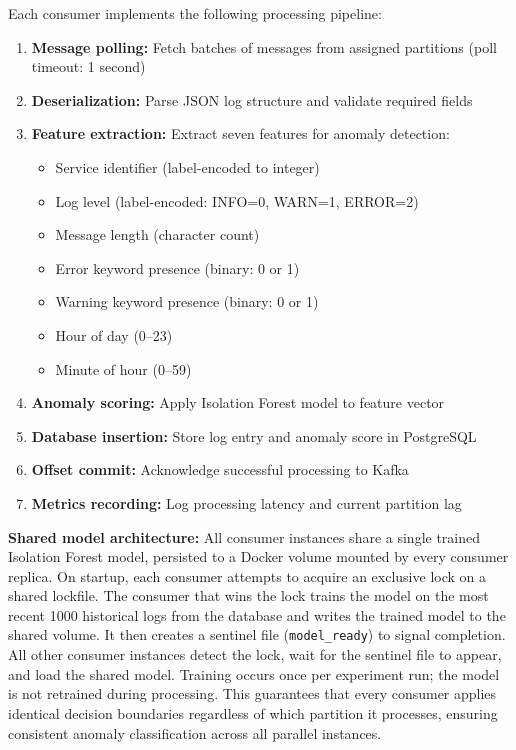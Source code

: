 \documentclass[12pt,a4paper]{report}
\begin{document}
Each consumer implements the following processing pipeline:

\begin{enumerate}
    \item \textbf{Message polling:} Fetch batches of messages from assigned partitions (poll timeout: 1 second)
    \item \textbf{Deserialization:} Parse JSON log structure and validate required fields
    \item \textbf{Feature extraction:} Extract seven features for anomaly detection:
    \begin{itemize}
        \item Service identifier (label-encoded to integer)
        \item Log level (label-encoded: INFO=0, WARN=1, ERROR=2)
        \item Message length (character count)
        \item Error keyword presence (binary: 0 or 1)
        \item Warning keyword presence (binary: 0 or 1)
        \item Hour of day (0--23)
        \item Minute of hour (0--59)
    \end{itemize}
    \item \textbf{Anomaly scoring:} Apply Isolation Forest model to feature vector
    \item \textbf{Database insertion:} Store log entry and anomaly score in PostgreSQL
    \item \textbf{Offset commit:} Acknowledge successful processing to Kafka
    \item \textbf{Metrics recording:} Log processing latency and current partition lag
\end{enumerate}

\textbf{Shared model architecture:} All consumer instances share a single trained
Isolation Forest model, persisted to a Docker volume mounted by every consumer replica.
On startup, each consumer attempts to acquire an exclusive lock on a shared lockfile.
The consumer that wins the lock trains the model on the most recent 1000 historical logs
from the database and writes the trained model to the shared volume. It then creates a
sentinel file (\texttt{model\_ready}) to signal completion. All other consumer instances
detect the lock, wait for the sentinel file to appear, and load the shared model. Training
occurs once per experiment run; the model is not retrained during processing. This
guarantees that every consumer applies identical decision boundaries regardless of which
partition it processes, ensuring consistent anomaly classification across all parallel
instances.
\end{document}
